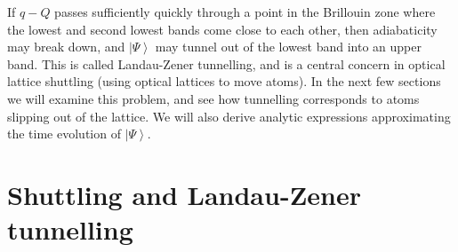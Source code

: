 \documentclass[aps,prb,floatfix,amsmath,amssymb,groupedaddress]{revtex4}
\begin{document}
If $q-Q$ passes sufficiently quickly through a point in the Brillouin zone where the lowest and second lowest bands come close to each other, then adiabaticity may break down, and $\left|\Psi\right>$ may tunnel out of the lowest band into an upper band.  This is called Landau-Zener tunnelling, and is a central concern in optical lattice shuttling (using optical lattices to move atoms).  In the next few sections we will examine this problem, and see how tunnelling corresponds to atoms slipping out of the lattice.  We will also derive analytic expressions approximating the time evolution of $\left|\Psi\right>$. 

\section{Shuttling and Landau-Zener tunnelling}
\end{document}
